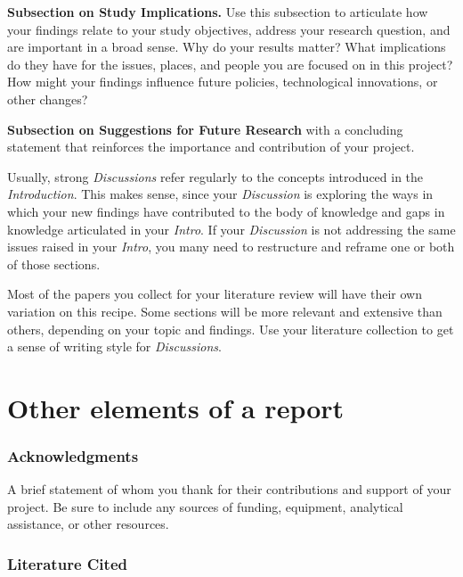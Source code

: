 \documentclass[
]{book}
\begin{document}
\textbf{Subsection on Study Implications.} Use this subsection to articulate how your findings relate to your study objectives, address your research question, and are important in a broad sense. Why do your results matter? What implications do they have for the issues, places, and people you are focused on in this project? How might your findings influence future policies, technological innovations, or other changes?

\textbf{Subsection on Suggestions for Future Research} with a concluding statement that reinforces the importance and contribution of your project.

Usually, strong \emph{Discussions} refer regularly to the concepts introduced in the \emph{Introduction}. This makes sense, since your \emph{Discussion} is exploring the ways in which your new findings have contributed to the body of knowledge and gaps in knowledge articulated in your \emph{Intro}. If your \emph{Discussion} is not addressing the same issues raised in your \emph{Intro}, you many need to restructure and reframe one or both of those sections.

Most of the papers you collect for your literature review will have their own variation on this recipe. Some sections will be more relevant and extensive than others, depending on your topic and findings. Use your literature collection to get a sense of writing style for \emph{Discussions}.

\hypertarget{other-elements-of-a-report}{%
\section*{Other elements of a report}\label{other-elements-of-a-report}}

\hypertarget{acknowledgments}{%
\subsubsection*{Acknowledgments}\label{acknowledgments}}

A brief statement of whom you thank for their contributions and support of your project. Be sure to include any sources of funding, equipment, analytical assistance, or other resources.

\hypertarget{literature-cited}{%
\subsubsection*{Literature Cited}\label{literature-cited}}
\end{document}
